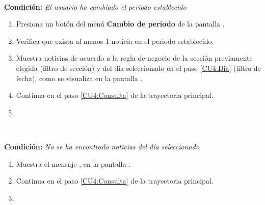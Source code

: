 \begin{large}
	\\
\end{large}	
\textbf{Condición:} \textit{El usuario ha cambiado el periodo establecido}

\begin{enumerate}[{B-}1.]

	\item \actor \label{CU4:Dia}Presiona un botón del menú \textbf{Cambio de periodo} de la pantalla .

	\item \sistema Verifica que exista al menos 1 noticia en el periodo establecido. 

	\item \sistema Muestra noticias de acuerdo a la regla de negocio  de la sección previamente elegida (filtro de sección) y del día seleccionado en el paso \ref{CU4:Dia} (filtro de fecha), como se visualiza en la pantalla .

	\item \sistema Continua en el paso \ref{CU4:Consulta} de la trayectoria principal.

	\item \finTA

\end{enumerate}


\begin{large}
	\\
\end{large}	
\textbf{Condición:} \textit{No se ha encontrado noticias del día seleccionado }

\begin{enumerate}[{C-}1.]

	\item \sistema Muestra el mensaje , en la pantalla .

	\item \sistema Continua en el paso \ref{CU4:Consulta} de la trayectoria principal.

	\item \finTA

\end{enumerate}

